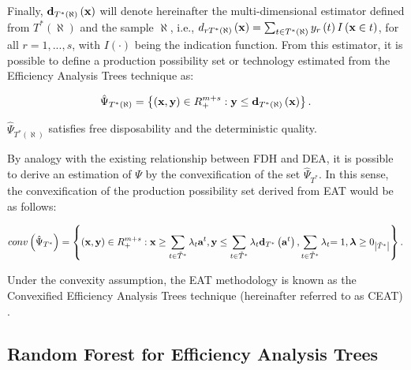 Finally,
\({\it \textbf{d}}_{T^{*} \left(\aleph \right)} \left({\it \textbf{x}}\right)\)
will denote hereinafter the multi-dimensional estimator defined from
\(T^{*} \left(\aleph \right)\) and the sample \(\aleph\), i.e.,
\(d_{rT^{*} \left(\aleph \right)} \left({\it \textbf{x}}\right)=\sum _{t\in T^{*} \left(\aleph \right)}y_{r} \left(t\right)I\left({\it \textbf{x}}\in t\right)\),
for all \(r=1,...,s\), with \(I\left(\cdot \right)\) being the
indication function. From this estimator, it is possible to define a
production possibility set or technology estimated from the Efficiency
Analysis Trees technique as:

\begin{equation} \label{(4)} 
\hat{\Psi}_{T^{*} (\aleph)} =\left\{\left({\it \textbf{x}},{\it \textbf{y}}\right)\in R_{+}^{m+s} :{\it \textbf{y}}\le {\it \textbf{d}}_{T^{*} \left(\aleph \right)} \left({\it \textbf{x}}\right)\right\}. 
\end{equation}

\(\hat{\Psi }_{T^{*} \left(\aleph \right)}\) satisfies free
disposability and the deterministic quality.

By analogy with the existing relationship between FDH and DEA, it is
possible to derive an estimation of \(\Psi\) by the convexification of
the set \(\hat{\Psi }_{T^{*}}\). In this sense, the convexification of
the production possibility set derived from EAT would be as follows:

\begin{equation} \label{(5)} 
conv\left(\hat{\Psi}_{T^{*} } \right)=\left\{\left({\it \textbf{x}},{\it \textbf{y}}\right)\in R_{+}^{m+s} :{\it \textbf{x}}\ge \sum _{t\in \tilde{T}^{*} }^{}\lambda _{t} {\it \textbf{a}}^{t}  ,{\it \textbf{y}}\le \sum _{t\in \tilde{T}^{*} }^{}\lambda _{t} {\it \textbf{d}}_{T^{*} } \left({\it \textbf{a}}^{t} \right) ,\sum _{t\in \tilde{T}^{*} }^{}\lambda_{t}  {\rm =1}{\it ,\boldsymbol{\lambda}}\ge 0_{\left|\tilde{T}^{*} \right|} \right\}. 
\end{equation}

Under the convexity assumption, the EAT methodology is known as the
Convexified Efficiency Analysis Trees technique (hereinafter referred to
as CEAT) \citep[see][]{aparicio2021}.

\hypertarget{section2.2}{%
\subsection{Random Forest for Efficiency Analysis
Trees}\label{section2.2}}

